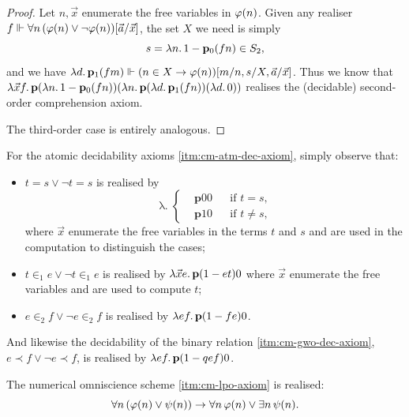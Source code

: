 \documentclass[12pt,openany]{book}
\theoremstyle{plain}
\theoremstyle{definition}
\newcommand\opA[1]{\mathop{\forall #1}}
\newcommand\opE[1]{\mathop{\exists #1}}
\newcommand\oplam[1]{\mathop{\lambda #1.}}
\newcommand\bp{\mathbf{p}}
\begin{document}
\begin{proof}
  Let $n, \vec{x}$ enumerate the free variables in $\varphi\mleft(n\mright)$. Given any realiser $f \Vdash {\opA{n} \left(\varphi\mleft(n\mright) \lor \neg \varphi\mleft(n\mright)\right)}\mleft[\vec{a}/\vec{x}\mright]$, the set $X$ we need is simply
  \[s = \oplam{n} 1 - \bp_0 \mleft(fn\mright) \in S_2,\]
  and we have $\oplam{d} \bp_1 \mleft(fm\mright) \Vdash \mleft(n \in X \rightarrow \varphi\mleft(n\mright)\mright)\mleft[m/n, s/X, \vec{a}/\vec{x}\mright]$. Thus we know that $\oplam{\vec{x} f} \bp \mleft(\oplam{n} 1 - \bp_0 \mleft(fn\mright)\mright) \mleft(\oplam{n} \bp \mleft(\oplam{d} \bp_1 \mleft(fn\mright)\mright) \mleft(\oplam{d} 0\mright)\mright)$ realises the (decidable) second-order comprehension axiom.

  The third-order case is entirely analogous.
\end{proof}

For the atomic decidability axioms \ref{itm:cm-atm-dec-axiom}, simply observe that:
\begin{itemize}
  \item $t = s \lor \neg t = s$ is realised by
        \[\oplam{\vec{x}} \left\{\begin{aligned}
             & \bp 00 &  & \text{if $t = s$},    \\
             & \bp 10 &  & \text{if $t \neq s$},
          \end{aligned}\right.\]
        where $\vec{x}$ enumerate the free variables in the terms $t$ and $s$ and are used in the computation to distinguish the cases;
  \item $t \in_1 e \lor \neg t \in_1 e$ is realised by $\oplam{\vec{x} e} \bp \mleft(1 - et\mright) 0$ where $\vec{x}$ enumerate the free variables and are used to compute $t$;
  \item $e \in_2 f \lor \neg e \in_2 f$ is realised by $\oplam{ef} \bp \mleft(1 - fe\mright) 0$.
\end{itemize}
And likewise the decidability of the binary relation \ref{itm:cm-gwo-dec-axiom}, $e \prec f \lor \neg e \prec f$, is realised by $\oplam{ef} \bp \mleft(1 - qef\mright) 0$.

\begin{lemma}
  \label{lem:cm-num-omni-real}
  The numerical omniscience scheme \ref{itm:cm-lpo-axiom} is realised:
  \[\opA{n} \left(\varphi\mleft(n\mright) \lor \psi\mleft(n\mright)\right) \rightarrow \opA{n} \varphi\mleft(n\mright) \lor \opE{n} \psi\mleft(n\mright).\]
\end{lemma}
\end{document}
